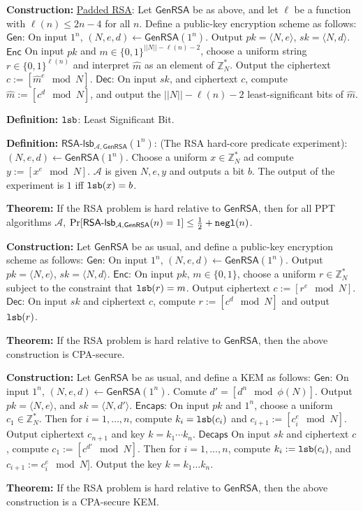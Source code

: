 \documentclass[10pt]{article}
\newcommand{\Z}{\mathbb{Z}}
\newcommand{\AAA}{\mathcal{A}}
\newcommand{\defn}[1]{{\bf Definition:} \underline{#1}}
\newcommand{\thm}[1]{{\bf Theorem:} \underline{#1}}
\newcommand{\con}[1]{{\bf Construction:} \underline{#1}}
\newcommand{\Enc}{\mathsf{Enc}}
\newcommand{\Dec}{\mathsf{Dec}}
\newcommand{\Encaps}{\mathsf{Encaps}}
\newcommand{\Decaps}{\mathsf{Decaps}}
\newcommand{\Gen}{\mathsf{Gen}}
\newcommand{\GenRSA}{\mathsf{GenRSA}}
\newcommand{\ang}[1]{\langle#1\rangle}
\newcommand{\ExptRSAHC}{\mathsf{RSA\text{-}lsb}_{\AAA,\GenRSA}}
\newcommand{\negl}{{\tt negl}}
\newcommand{\lsb}{{\tt lsb}}
\newcommand{\from}{\leftarrow}
\begin{document}
\begin{multicols}{4}
\con{Padded RSA}: Let $\GenRSA$ be as above, and let $\ell$ be a function with $\ell(n)\leq2n-4$ for all $n$. Define a public-key encryption scheme as follows: $\Gen$: On input $1^n$, $(N,e,d)\from\GenRSA(1^n)$. Output $pk=\ang{N,e}$, $sk=\ang{N,d}$. $\Enc$ On input $pk$ and $m\in\{0,1\}^{||N||-\ell(n)-2}$, choose a uniform string $r\in\{0,1\}^{\ell(n)}$ and interpret $\hat{m}$ as an element of $\Z_N^*$. Output the ciphertext $c:=[\hat{m}^e\mod{N}]$. $\Dec$: On input $sk$, and ciphertext $c$, compute $\hat{m}:=[c^d\mod{N}]$, and output the $||N||-\ell(n)-2$ least-significant bits of $\hat{m}$.

\defn{$\lsb$}: Least Significant Bit.

\defn{$\ExptRSAHC(1^n)$}: (The RSA hard-core predicate experiment): $(N,e,d)\from\GenRSA(1^n)$. Choose a uniform $x\in\Z_N^*$ ad compute $y:=[x^e\mod{N}]$. $\AAA$ is given $N,e,y$ and outputs a bit $b$. The output of the experiment is $1$ iff $\lsb(x)=b$.

\thm{}If the RSA problem is hard relative to $\GenRSA$, then for all PPT algorithms $\AAA$, $\Pr[\ExptRSAHC(n)=1]\leq\frac{1}{2}+\negl(n)$.

\con{}Let $\GenRSA$ be as usual, and define a public-key encryption scheme as follows: $\Gen$: On input $1^n$, $(N,e,d)\from\GenRSA(1^n)$. Output $pk=\ang{N,e}$, $sk=\ang{N,d}$. $\Enc$: On input $pk$, $m\in\{0,1\}$, choose a uniform $r\in\Z_N^*$ subject to the constraint that $\lsb(r)=m$. Output ciphertext $c:=[r^e\mod{N}]$. $\Dec$: On input $sk$ and ciphertext $c$, compute $r:=[c^d\mod{N}]$ and output $\lsb(r)$.

\thm{}If the RSA problem is hard relative to $\GenRSA$, then the above construction is CPA-secure.

\con{}Let $\GenRSA$ be as usual, and define a KEM as follows: $\Gen$: On input $1^n$, $(N,e,d)\from\GenRSA(1^n)$. Comute $d'=[d^n\mod{\phi(N)}]$. Output $pk=\ang{N,e}$, and $sk=\ang{N,d'}$. $\Encaps$: On input $pk$ and $1^n$, choose a uniform $c_1\in\Z_N^*$. Then for $i=1,\dots,n$, compute $k_i=\lsb(c_i)$ and $c_{i+1}:=[c_i^e\mod{N}]$. Output ciphertext $c_{n+1}$ and key $k=k_1\cdots k_n$. $\Decaps$ On input $sk$ and ciphertext $c$, compute $c_1:=[c^{d'}\mod{N}]$. Then for $i=1,\dots,n$, compute $k_i:=\lsb(c_i)$, and $c_{i+1}:=c_i^e\mod{N}]$. Output the key $k=k_1\dots k_n$.

\thm{}If the RSA problem is hard relative to $\GenRSA$, then the above construction is a CPA-secure KEM.


\end{multicols}
\end{document}

